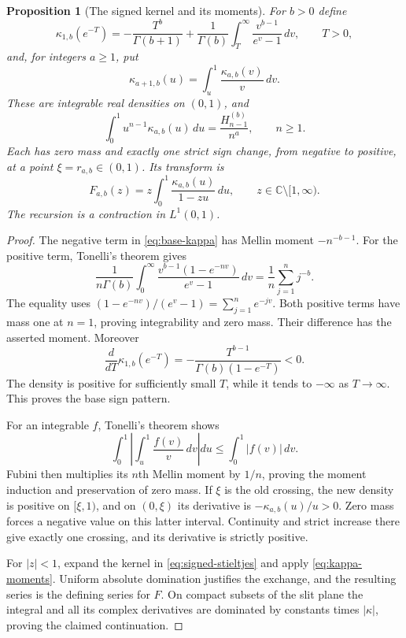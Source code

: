 \documentclass[11pt]{article}
\numberwithin{equation}{section}
\theoremstyle{plain}
\newtheorem{proposition}[theorem]{Proposition}
\theoremstyle{definition}
\theoremstyle{remark}
\newcommand{\C}{\mathbb C}
\begin{document}
\begin{proposition}[The signed kernel and its moments]
\label{prop:signed-kernel}
For $b>0$ define
\begin{equation}\label{eq:base-kappa}
 \kappa_{1,b}(e^{-T})
 =-\frac{T^b}{\Gamma(b+1)}
 +\frac1{\Gamma(b)}\int_T^\infty\frac{v^{b-1}}{e^v-1}\,dv,
 \qquad T>0,
\end{equation}
and, for integers $a\ge1$, put
\begin{equation}\label{eq:kappa-recursion}
 \kappa_{a+1,b}(u)=\int_u^1\frac{\kappa_{a,b}(v)}v\,dv.
\end{equation}
These are integrable real densities on $(0,1)$, and
\begin{equation}\label{eq:kappa-moments}
 \int_0^1u^{n-1}\kappa_{a,b}(u)\,du
 =\frac{H_{n-1}^{(b)}}{n^a},\qquad n\ge1.
\end{equation}
Each has zero mass and exactly one strict sign change, from negative to
positive, at a point $\xi=r_{a,b}\in(0,1)$. Its transform is
\begin{equation}\label{eq:signed-stieltjes}
 F_{a,b}(z)=z\int_0^1\frac{\kappa_{a,b}(u)}{1-zu}\,du,
 \qquad z\in\C\setminus[1,\infty).
\end{equation}
The recursion is a contraction in $L^1(0,1)$.
\end{proposition}

\begin{proof}
The negative term in \eqref{eq:base-kappa} has Mellin moment
$-n^{-b-1}$. For the positive term, Tonelli's theorem gives
\[
 \frac1{n\Gamma(b)}\int_0^\infty
     \frac{v^{b-1}(1-e^{-nv})}{e^v-1}\,dv
 =\frac1n\sum_{j=1}^n j^{-b}.
\]
The equality uses
$(1-e^{-nv})/(e^v-1)=\sum_{j=1}^n e^{-jv}$.
Both positive terms have mass one at $n=1$, proving integrability and
zero mass. Their difference has the asserted moment.
Moreover
\[
 \frac{d}{dT}\kappa_{1,b}(e^{-T})
 =-\frac{T^{b-1}}{\Gamma(b)(1-e^{-T})}<0.
\]
The density is positive for sufficiently small $T$, while it tends to
$-\infty$ as $T\to\infty$. This proves the base sign pattern.

For an integrable $f$, Tonelli's theorem shows
\[
 \int_0^1\left|\int_u^1\frac{f(v)}v\,dv\right|du
 \le\int_0^1|f(v)|\,dv.
\]
Fubini then multiplies its $n$th Mellin moment by $1/n$, proving the
moment induction and preservation of zero mass. If $\xi$ is the old
crossing, the new density is positive on $[\xi,1)$, and on $(0,\xi)$
its derivative is $-\kappa_{a,b}(u)/u>0$. Zero mass forces a negative
value on this latter interval. Continuity and strict increase there
give exactly one crossing, and its derivative is strictly positive.

For $|z|<1$, expand the kernel in \eqref{eq:signed-stieltjes} and apply
\eqref{eq:kappa-moments}. Uniform absolute domination justifies the
exchange, and the resulting series is the defining series for $F$.
On compact subsets of the slit plane the integral and all its complex
derivatives are dominated by constants times $|\kappa|$, proving the
claimed continuation.
\end{proof}
\end{document}
